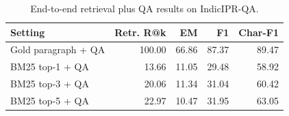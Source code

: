 \begin{table}[htbp]
\centering
\caption{End-to-end retrieval plus QA results on IndicIPR-QA.}
\label{tab:retrieval_qa}
\scriptsize
\begin{tabular}{lrrrr}
\toprule
Setting & Retr. R@k & EM & F1 & Char-F1 \\
\midrule
Gold paragraph + QA & 100.00 & 66.86 & 87.37 & 89.47 \\
BM25 top-1 + QA & 13.66 & 11.05 & 29.48 & 58.92 \\
BM25 top-3 + QA & 20.06 & 11.34 & 31.04 & 60.42 \\
BM25 top-5 + QA & 22.97 & 10.47 & 31.95 & 63.05 \\
\bottomrule
\end{tabular}
\end{table}
